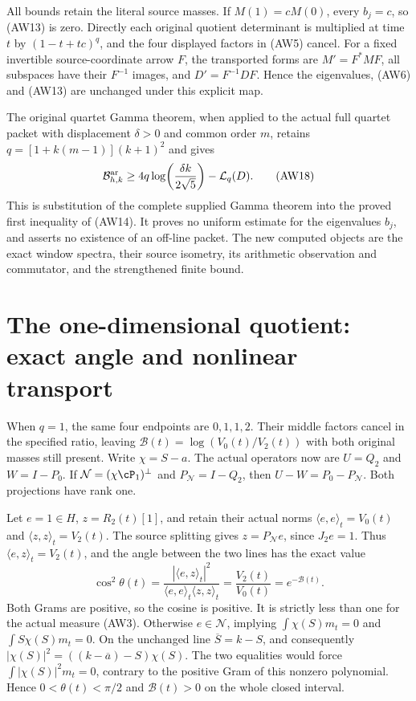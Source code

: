 \documentclass[10pt,a4paper,oneside]{report}
\begin{document}
All bounds retain the literal source masses. If $M(1)=cM(0)$,
every $b_j=c$, so (AW13) is zero. Directly each original
quotient determinant is multiplied at time $t$ by
$(1-t+tc)^q$, and the four displayed factors in (AW5) cancel.
For a fixed invertible source-coordinate arrow $F$, the transported
forms are $M'=F^*MF$, all subspaces have their $F^{-1}$ images,
and $D'=F^{-1}DF$. Hence the eigenvalues, (AW6) and (AW13)
are unchanged under this explicit map.

The original quartet Gamma theorem, when applied to the actual
full quartet packet with displacement $\delta>0$ and common
order $m$, retains $q=[1+k(m-1)](k+1)^2$ and gives
\[
 \mathcal B^{\rm ar}_{h,k}
 \ge4q\log\!\left(\frac{\delta k}{2\sqrt5}\right)
             -\mathcal L_q(D).
 \tag{AW18}
\]
This is substitution of the complete supplied Gamma theorem
into the proved first inequality of (AW14). It proves no
uniform estimate for the eigenvalues $b_j$, and asserts no
existence of an off-line packet. The new computed objects are
the exact window spectra, their source isometry, its arithmetic
observation and commutator, and the strengthened finite bound.

\section{The one-dimensional quotient: exact angle and nonlinear transport}

When $q=1$, the same four endpoints are $0,1,1,2$. Their
middle factors cancel in the specified ratio, leaving
$\mathcal B(t)=\log(V_0(t)/V_2(t))$ with both original masses
still present. Write $\chi=S-a$. The actual operators now are
$U=Q_2$ and $W=I-P_0$. If $\mathcal N=(\chi\cP_1)^\perp$
and $P_{\mathcal N}=I-Q_2$, then
$U-W=P_0-P_{\mathcal N}$. Both projections have rank one.

Let $e=1\in H$, $z=R_2(t)[1]$, and retain their actual norms
$\langle e,e\rangle_t=V_0(t)$ and
$\langle z,z\rangle_t=V_2(t)$. The source splitting gives
$z=P_{\mathcal N}e$, since $J_2e=1$. Thus
$\langle e,z\rangle_t=V_2(t)$, and the angle between the
two lines has the exact value
\[
 \cos^2\theta(t)=\frac{|\langle e,z\rangle_t|^2}
                         {\langle e,e\rangle_t\langle z,z\rangle_t}
       =\frac{V_2(t)}{V_0(t)}=e^{-\mathcal B(t)}.
 \tag{AW19}
\]
Both Grams are positive, so the cosine is positive. It is
strictly less than one for the actual measure (AW3).
Otherwise $e\in\mathcal N$, implying
$\int\chi(S)m_t=0$ and $\int S\chi(S)m_t=0$.
On the unchanged line $\overline S=k-S$, and consequently
$|\chi(S)|^2=((k-\overline a)-S)\chi(S)$.
The two equalities would force $\int|\chi(S)|^2m_t=0$,
contrary to the positive Gram of this nonzero polynomial.
Hence $0<\theta(t)<\pi/2$ and $\mathcal B(t)>0$ on the
whole closed interval.
\end{document}
